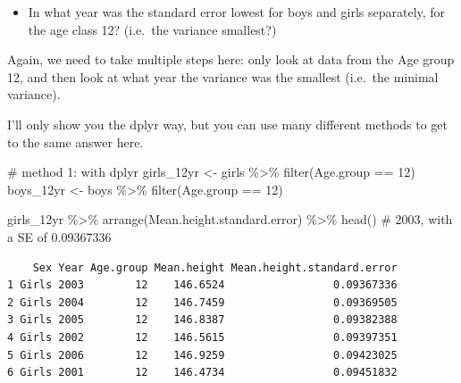 \documentclass[
  letterpaper,
  DIV=11,
  numbers=noendperiod]{scrreprt}
\newenvironment{Shaded}{}{}
\newcommand{\CommentTok}[1]{\textcolor[rgb]{0.42,0.45,0.49}{#1}}
\newcommand{\DecValTok}[1]{\textcolor[rgb]{0.00,0.36,0.77}{#1}}
\newcommand{\FunctionTok}[1]{\textcolor[rgb]{0.44,0.26,0.76}{#1}}
\newcommand{\NormalTok}[1]{\textcolor[rgb]{0.14,0.16,0.18}{#1}}
\newcommand{\OtherTok}[1]{\textcolor[rgb]{0.44,0.26,0.76}{#1}}
\newcommand{\SpecialCharTok}[1]{\textcolor[rgb]{0.00,0.36,0.77}{#1}}
\providecommand{\tightlist}{%
  \setlength{\itemsep}{0pt}\setlength{\parskip}{0pt}}\usepackage{longtable,booktabs,array}
\begin{document}
\begin{itemize}
\tightlist
\item
  In what year was the standard error lowest for boys and girls
  separately, for the age class 12? (i.e.~the variance smallest?)
\end{itemize}

Again, we need to take multiple steps here: only look at data from the
Age group 12, and then look at what year the variance was the smallest
(i.e.~the minimal variance).

I'll only show you the dplyr way, but you can use many different methods
to get to the same answer here.

\begin{tcolorbox}[enhanced jigsaw, arc=.35mm, left=2mm, titlerule=0mm, rightrule=.15mm, colframe=quarto-callout-tip-color-frame, coltitle=black, colback=white, opacityback=0, bottomtitle=1mm, bottomrule=.15mm, colbacktitle=quarto-callout-tip-color!10!white, breakable, title=\textcolor{quarto-callout-tip-color}{\faLightbulb}\hspace{0.5em}{Code and answer}, toptitle=1mm, toprule=.15mm, opacitybacktitle=0.6, leftrule=.75mm]

\begin{Shaded}
\begin{Highlighting}[]
\CommentTok{\# method 1: with dplyr}
\NormalTok{girls\_12yr }\OtherTok{\textless{}{-}}\NormalTok{ girls }\SpecialCharTok{\%\textgreater{}\%} \FunctionTok{filter}\NormalTok{(Age.group }\SpecialCharTok{==} \DecValTok{12}\NormalTok{)}
\NormalTok{boys\_12yr }\OtherTok{\textless{}{-}}\NormalTok{ boys }\SpecialCharTok{\%\textgreater{}\%} \FunctionTok{filter}\NormalTok{(Age.group }\SpecialCharTok{==} \DecValTok{12}\NormalTok{)}

\NormalTok{girls\_12yr }\SpecialCharTok{\%\textgreater{}\%} \FunctionTok{arrange}\NormalTok{(Mean.height.standard.error) }\SpecialCharTok{\%\textgreater{}\%} \FunctionTok{head}\NormalTok{() }\CommentTok{\# 2003, with a SE of 0.09367336}
\end{Highlighting}
\end{Shaded}

\begin{verbatim}
    Sex Year Age.group Mean.height Mean.height.standard.error
1 Girls 2003        12    146.6524                 0.09367336
2 Girls 2004        12    146.7459                 0.09369505
3 Girls 2005        12    146.8387                 0.09382388
4 Girls 2002        12    146.5615                 0.09397351
5 Girls 2006        12    146.9259                 0.09423025
6 Girls 2001        12    146.4734                 0.09451832
\end{verbatim}


\end{tcolorbox}
\end{document}
